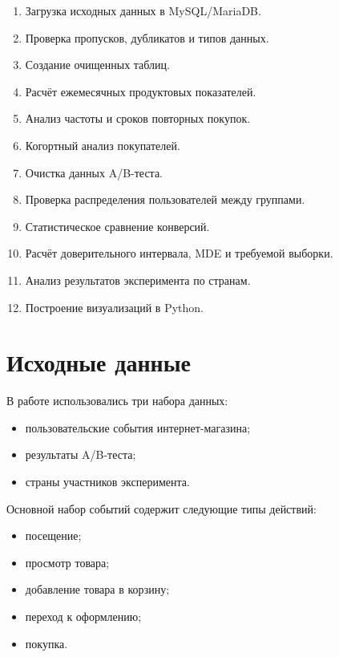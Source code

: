 \documentclass[12pt,a4paper]{extarticle}
\begin{document}
\begin{enumerate}
    \item Загрузка исходных данных в MySQL/MariaDB.
    \item Проверка пропусков, дубликатов и типов данных.
    \item Создание очищенных таблиц.
    \item Расчёт ежемесячных продуктовых показателей.
    \item Анализ частоты и сроков повторных покупок.
    \item Когортный анализ покупателей.
    \item Очистка данных A/B-теста.
    \item Проверка распределения пользователей между группами.
    \item Статистическое сравнение конверсий.
    \item Расчёт доверительного интервала, MDE и требуемой выборки.
    \item Анализ результатов эксперимента по странам.
    \item Построение визуализаций в Python.
\end{enumerate}

\newpage
\section{Исходные данные}

В работе использовались три набора данных:

\begin{itemize}
    \item пользовательские события интернет-магазина;
    \item результаты A/B-теста;
    \item страны участников эксперимента.
\end{itemize}

Основной набор событий содержит следующие типы действий:

\begin{itemize}
    \item посещение;
    \item просмотр товара;
    \item добавление товара в корзину;
    \item переход к оформлению;
    \item покупка.
\end{itemize}
\end{document}
